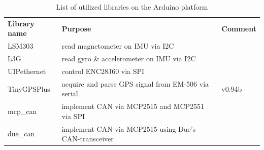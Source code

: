 \documentclass[ExampleMasters.tex]{subfiles}
\begin{document}
\begin{table}[!htb]
	\label{tab:list_of_arduino_libs}
	\begin{tabular}{lll}
		\textbf{Library name} & \textbf{Purpose}                                    & \textbf{Comment} \\
		LSM303                & read magnetometer on \gls{IMU} via I2C                    &                \cite{lsm303_github}  \\
		L3G                   & read gyro \& accelerometer on \gls{IMU} via I2C           &      
		\cite{l3g_github}            \\
		UIPethernet           &     control ENC28J60 via \gls{SPI}                                                 &             \cite{uip_ethernet_github}     \\
		TinyGPSPlus           & acquire and parse GPS signal from EM-506 via serial & v0.94b\cite{tiny_gps_plus_github}     \\
		mcp\_can & implement \gls{CAN} via MCP2515 and MCP2551 via \gls{SPI}      & \cite{mcp_can_github}\\
		due\_can & implement \gls{CAN} via MCP2515 using Due's \gls{CAN}-transceiver   & \cite{due_can_github}
	\end{tabular}
	
	\caption{List of utilized libraries on the Arduino platform}
\end{table}
\end{document}
